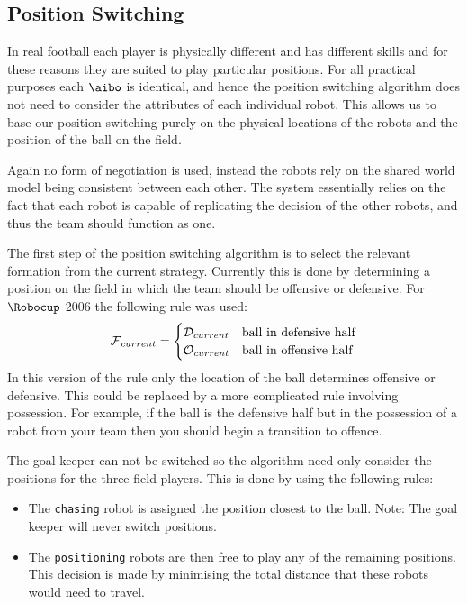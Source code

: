 \subsection{Position Switching}
\label{subsec:positionswitching}

In real football each player is physically different and has
different skills and for these reasons they are suited to play
particular positions. For all practical purposes each $\aibo$ is
identical, and hence the position switching algorithm does not need
to consider the attributes of each individual robot. This allows us
to base our position switching purely on the physical locations of
the robots and the position of the ball on the field.

Again no form of negotiation is used, instead the robots rely on the
shared world model being consistent between each other. The system essentially
relies on the fact that each robot is capable of replicating the
decision of the other robots, and thus the team should function as one.

The first step of the position switching algorithm is to select the
relevant formation from the current strategy. Currently this is done
by determining a position on the field in which the team should be
offensive or defensive. For $\Robocup$ 2006 the following
rule was used:
\begin{gather*} \raisetag{-10pt}
\Formation_{current} = \begin{cases}
                \FormationDef_{current} & \text{ball in defensive half} \\
                \FormationOff_{current} & \text{ball in offensive half}
            \end{cases}
\end{gather*}
In this version of the rule only the location of the ball determines offensive or defensive. This could be replaced by a more complicated rule involving possession. For example, if the ball is the defensive half but in the possession of a robot from your team then you should begin a transition to offence. 

The goal keeper can not be switched so the algorithm need only consider the
positions for the three field players. This is done by using the following
rules:
\begin{itemize}
    \item The \texttt{chasing} robot is assigned the position closest to the ball. Note: The goal keeper will never switch positions.
    \item The \texttt{positioning} robots are then free to play any of the remaining positions. This decision is made by minimising the total distance that these robots would need to travel.
\end{itemize}

